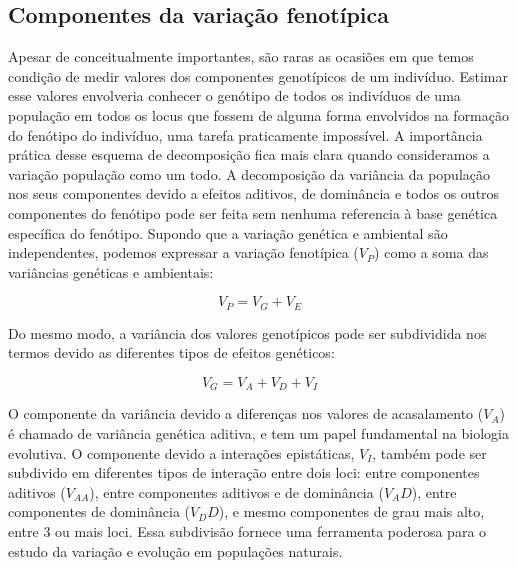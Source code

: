 \begin{refsection}
\subsection{Componentes da variação fenotípica}

Apesar de conceitualmente importantes, são raras as ocasiões em que temos
condição de medir valores dos componentes genotípicos de um indivíduo. Estimar
esse valores envolveria conhecer o genótipo de todos os indivíduos de uma
população em todos os locus que fossem de alguma forma envolvidos na formação
do fenótipo do indivíduo, uma tarefa praticamente impossível. A importância
prática desse esquema de decomposição fica mais clara quando consideramos a
variação população como um todo. A decomposição da variância da população nos
seus componentes devido a efeitos aditivos, de dominância e todos os outros
componentes do fenótipo pode ser feita sem nenhuma referencia à base genética
específica do fenótipo. Supondo que a variação genética e ambiental são
independentes, podemos expressar a variação fenotípica ($V_P$) como a soma das
variâncias genéticas e ambientais:

\begin{equation}
V_P = V_G + V_E
\end{equation}

Do mesmo modo, a variância dos valores genotípicos pode ser subdividida nos termos devido as diferentes tipos de efeitos genéticos:

\begin{equation}
V_G = V_A + V_D + V_I
\end{equation}

O componente da variância devido a diferenças nos valores de acasalamento
($V_A$) é chamado de variância genética aditiva, e tem um papel fundamental na
biologia evolutiva. O componente devido a interações epistáticas, $V_I$,
também pode ser subdivido em diferentes tipos de interação entre dois loci:
entre componentes aditivos ($V_{AA}$), entre componentes aditivos e de
dominância ($V_AD$), entre componentes de dominância ($V_DD$), e mesmo
componentes de grau mais alto, entre 3 ou mais loci. Essa subdivisão fornece
uma ferramenta poderosa para o estudo da variação e evolução em populações
naturais.


\end{refsection}
